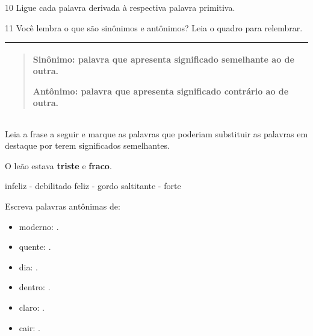 \num{10} Ligue cada palavra derivada à respectiva palavra primitiva.

%
%
%
%
%
%
%


\num{11} Você lembra o que são sinônimos e antônimos? Leia o quadro para
relembrar.


\begin{longtable}[]{@{}l@{}}
\toprule
\begin{minipage}[t]{0.97\columnwidth}\raggedright\strut
\begin{quote}
\textbf{Sinônimo}: palavra que apresenta significado semelhante ao de
outra.

\textbf{Antônimo}: palavra que apresenta significado contrário ao de
outra.
\end{quote}\strut
\end{minipage}\tabularnewline
\bottomrule
\end{longtable}

\begin{escolha}
\item Leia a frase a seguir e marque as palavras que poderiam substituir as
palavras em destaque por terem significados semelhantes.

O leão estava \textbf{triste} e \textbf{fraco}.

\begin{boxlist}
\boxitem[X] infeliz - debilitado
\boxitem[] feliz - gordo
\boxitem[] saltitante - forte
\end{boxlist}

\item Escreva palavras antônimas de:

\begin{itemize}
\item
  moderno: .
\item
  quente: .
\item
  dia: .
\item
  dentro: .
\item
  claro: .
\item
  cair: .
\end{itemize}
\end{escolha}

